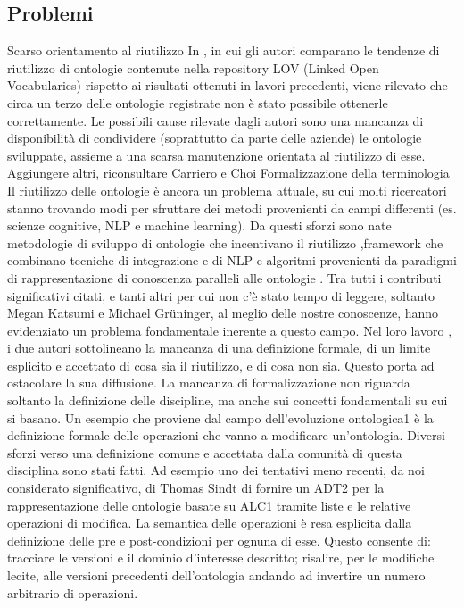 \subsection{Problemi}
Scarso orientamento al riutilizzo In \cite{...}, in cui gli autori comparano le tendenze di riutilizzo di ontologie contenute nella repository LOV (Linked Open Vocabularies) rispetto ai risultati ottenuti in lavori precedenti, viene rilevato che circa un terzo delle ontologie registrate non è stato possibile ottenerle correttamente. Le possibili cause rilevate dagli autori sono una mancanza di disponibilità di condividere (soprattutto da parte delle aziende) le ontologie sviluppate, assieme a una scarsa manutenzione orientata al riutilizzo di esse.
Aggiungere altri, riconsultare Carriero e Choi
Formalizzazione della terminologia
Il riutilizzo delle ontologie è ancora un problema attuale, su cui molti ricercatori stanno trovando modi per sfruttare dei metodi provenienti da campi differenti (es. scienze cognitive, NLP e machine learning). Da questi sforzi sono nate metodologie di sviluppo di ontologie che incentivano il riutilizzo \cite{...},framework che combinano tecniche di integrazione e di NLP \cite{...} e algoritmi provenienti da paradigmi di rappresentazione di conoscenza paralleli alle ontologie \cite{...}. Tra tutti i contributi significativi citati, e tanti altri per cui non c'è stato tempo di leggere, soltanto Megan Katsumi e Michael Grüninger, al meglio delle nostre conoscenze, hanno evidenziato un problema fondamentale inerente a questo campo. Nel loro lavoro \cite{...}, i due autori sottolineano la mancanza di una definizione formale, di un limite esplicito e accettato di cosa sia il riutilizzo, e di cosa non sia. Questo porta ad ostacolare la sua diffusione. La mancanza di formalizzazione non riguarda soltanto la definizione delle discipline, ma anche sui concetti fondamentali su cui si basano. Un esempio che proviene dal campo dell'evoluzione ontologica1 è la definizione formale delle operazioni che vanno a modificare un'ontologia. Diversi sforzi verso una definizione comune e accettata dalla comunità di questa disciplina sono stati fatti. Ad esempio uno dei tentativi meno recenti, da noi considerato significativo, di Thomas Sindt \cite{...} di fornire un ADT2 per la rappresentazione delle ontologie basate su ALC1 tramite liste e le relative operazioni di modifica. La semantica delle operazioni è resa esplicita dalla definizione delle pre e post-condizioni per ognuna di esse. Questo consente di:
tracciare le versioni e il dominio d'interesse descritto;
risalire, per le modifiche lecite, alle versioni precedenti dell'ontologia andando ad invertire un numero arbitrario di operazioni.
